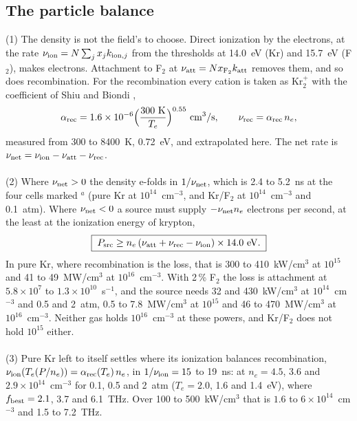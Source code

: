 \documentclass[11pt]{article}
\numberwithin{equation}{section}
\newcommand{\fbest}{f_{\rm best}}
\newcommand{\Te}{T_e}
\begin{document}
\subsection{The particle balance}
\label{sec:particles}
{\noindent}(1) The density is not the field's to choose. Direct ionization by the
electrons, at the rate $\nu_{\rm ion}=N\sum_jx_jk_{{\rm ion},j}$ from the thresholds at
14.0~eV (Kr) and 15.7~eV (F$_2$), makes electrons. Attachment to F$_2$ at
$\nu_{\rm att}=Nx_{{\rm F}_2}k_{\rm att}$ removes them, and so does recombination. For the
recombination every cation is taken as Kr$_2^+$ with the coefficient of Shiu and Biondi
\cite{ShiuBiondi1977},
\begin{equation}
\alpha_{\rm rec}=1.6\times10^{-6}\Big(\frac{300~{\rm K}}{\Te}\Big)^{0.55}~{\rm cm^3/s},\qquad
\nu_{\rm rec}=\alpha_{\rm rec}\,n_e,
\label{eq:rec}
\end{equation}
measured from 300 to 8400~K, 0.72~eV, and extrapolated here. The net rate is
$\nu_{\rm net}=\nu_{\rm ion}-\nu_{\rm att}-\nu_{\rm rec}$.
\\ \\
{\noindent}(2) Where $\nu_{\rm net}>0$ the density e-folds in $1/\nu_{\rm net}$, which is 2.4
to 5.2~ns at the four cells marked $^a$ (pure Kr at $10^{14}$~cm$^{-3}$, and Kr/F$_2$ at
$10^{14}$~cm$^{-3}$ and 0.1~atm). Where $\nu_{\rm net}<0$ a source must supply
$-\nu_{\rm net}n_e$ electrons per second, at the least at the ionization energy of krypton,
\begin{equation}
\boxed{\;P_{\rm src}\ge n_e\,(\nu_{\rm att}+\nu_{\rm rec}-\nu_{\rm ion})\times14.0~{\rm eV}.\;}
\label{eq:Psrc}
\end{equation}
In pure Kr, where recombination is the loss, that is 300 to 410~kW/cm$^3$ at $10^{15}$ and
41 to 49~MW/cm$^3$ at $10^{16}$~cm$^{-3}$. With 2\,\% F$_2$ the loss is attachment at
$5.8\times10^{7}$ to $1.3\times10^{10}$~s$^{-1}$, and the source needs 32 and 430~kW/cm$^3$ at
$10^{14}$~cm$^{-3}$ and 0.5 and 2~atm, 0.5 to 7.8~MW/cm$^3$ at $10^{15}$ and 46 to
470~MW/cm$^3$ at $10^{16}$~cm$^{-3}$. Neither gas holds $10^{16}$~cm$^{-3}$ at these powers,
and Kr/F$_2$ does not hold $10^{15}$ either.
\\ \\
{\noindent}(3) Pure Kr left to itself settles where its ionization balances
recombination, $\nu_{\rm ion}(\Te(P/n_e))=\alpha_{\rm rec}(\Te)\,n_e$, in $1/\nu_{\rm ion}=15$
to 19~ns: at $n_e=4.5$, 3.6 and $2.9\times10^{14}$~cm$^{-3}$ for 0.1, 0.5 and 2~atm
($\Te=2.0$, 1.6 and 1.4~eV), where $\fbest=2.1$, 3.7 and 6.1~THz. Over 100 to
500~kW/cm$^3$ that is $1.6$ to $6\times10^{14}$~cm$^{-3}$ and 1.5 to 7.2~THz.
\end{document}
